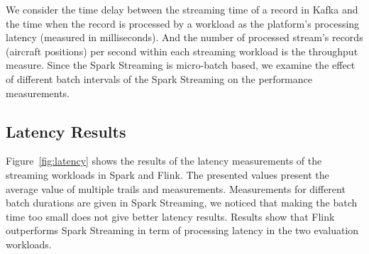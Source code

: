 \documentclass[]{article}
\begin{document}
\par We consider the time delay between the streaming time of a record in Kafka and  the time when the record is processed by a workload as the platform's processing latency (measured in milliseconds). And the number of processed stream's records (aircraft positions) per second within each streaming workload is the throughput measure. Since the Spark Streaming is micro-batch based,  we examine the effect of different batch intervals
of the Spark Streaming on the performance measurements.


\subsection{Latency Results}

Figure~\ref{fig:latency} shows the results of the latency measurements of the streaming workloads in Spark and Flink. The presented values present the average value of multiple trails and measurements. Measurements for different batch durations are given in Spark Streaming, we noticed that making the batch time too small does not give better latency results. Results show that Flink outperforms Spark Streaming in term of processing latency in the two evaluation workloads.
\end{document}
